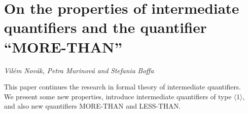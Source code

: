 \documentclass[../booklet.tex]{subfiles}
\begin{document}
\section[On the properties of intermediate quantifiers and the quantifier ``MORE-THAN''. {\it Vilém Novák, Petra Murinová and Stefania Boffa}]{On the properties of intermediate quantifiers and the quantifier ``MORE-THAN''}
  

\begin{center}
  {\it Vilém Novák, Petra Murinová and Stefania Boffa}
\end{center}

\vskip 0.8cm


This paper continues the research in formal theory of intermediate quantifiers. We present some new properties, introduce intermediate quantifiers of type $\langle 1\rangle$, and also new quantifiers MORE-THAN and LESS-THAN.
%
\end{document}
